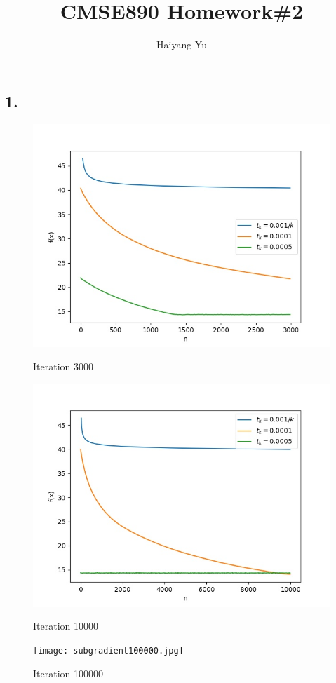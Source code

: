 \documentclass{article}
\title{CMSE890 Homework\#2}
\author{Haiyang Yu}
\begin{document}
\maketitle
\subsection*{1.}
\begin{figure}[h]
\begin{minipage}[t]{0.3\linewidth}
\centering
\includegraphics[width=1\textwidth]{subgradient3000.jpg}
\caption{Iteration 3000}
\end{minipage}
\hfill
\begin{minipage}[t]{0.3\linewidth}
\centering
\includegraphics[width=1\textwidth]{subgradient10000.jpg}
\caption{Iteration 10000}
\end{minipage}
\begin{minipage}[t]{0.3\linewidth}
\centering
\texttt{[image: subgradient100000.jpg]}
\caption{Iteration 100000}
\end{minipage}
\end{figure}
\end{document}
